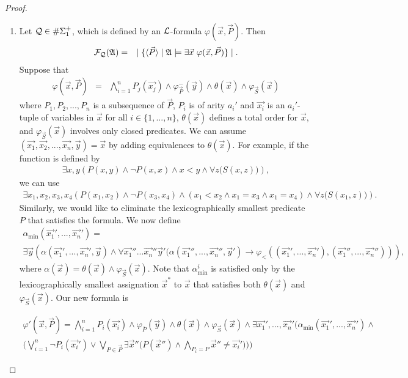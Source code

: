 \documentclass[12pt]{article}
\def\A{{\frak A}}
\def\L{{\cal L}}
\def\Q{{\cal Q}}
\def\F{{\cal F}}
\def\P{\vec{P}}
\def\S{\vec{S}}
\def\x{\vec{x}}
\begin{document}
\begin{proof}
\begin{enumerate}
\item Let $\Q \in \#\Sigma_1^+$, which is defined by an $\L$-formula $\varphi(\x,\P)$. Then
\begin{eqnarray*}
\F_\Q(\A) &=& \mid \{ \langle\P\rangle \mid \A \models \exists \x \ \varphi(\x,\P) \} \mid.
\end{eqnarray*}
Suppose that
\begin{eqnarray*}
\varphi(\x,\P) &=& \bigwedge_{i=1}^n P_j(\vec{x_j}) \wedge \varphi_{\P}^{-}(\vec{y}) \wedge \theta(\x) \wedge \varphi_{\S}(\x)
\end{eqnarray*}
where $P_1,P_2,...,P_n$ is a subsequence of $\P$, $P_i$ is of arity $a_i'$ and $\vec{x_i}$ is an $a_i'$-tuple of variables in $\x$ for all $i \in \{1,...,n\}$, $\theta(\x)$ defines a total order for $\x$, and $\varphi_{\S}(\x)$ involves only closed predicates. We can assume $(\vec{x_1},\vec{x_2},...,\vec{x_n},\vec{y}) = \x$ by adding equivalences to $\theta(\x)$. For example, if the function is defined by
\begin{eqnarray*}
\exists x,y \left( P(x,y) \wedge \neg P(x,x) \wedge x < y \wedge \forall z\big( S(x,z) \big) \right),
\end{eqnarray*}
we can use
\begin{eqnarray*}
\exists x_1,x_2,x_3,x_4 \left( P(x_1,x_2) \wedge \neg P(x_3,x_4) \wedge (x_1 < x_2 \wedge x_1 = x_3 \wedge x_1 = x_4 ) \wedge \forall z\big( S(x_1,z) \big) \right).
\end{eqnarray*}
Similarly, we would like to eliminate the lexicographically smallest predicate $P$ that satisfies the formula. We now define
\begin{multline*}
\alpha_{\min}(\vec{x_1}',...,\vec{x_n}') = \\ \exists\vec{y}\left( \alpha(\vec{x_1}',...,\vec{x_n}',\vec{y})\wedge \forall\vec{x_1}''...\vec{x_n}''\vec{y}'(\alpha(\vec{x_1}'',...,\vec{x_n}'',\vec{y}')\rightarrow \varphi_<((\vec{x_1}',...,\vec{x_n}'),(\vec{x_1}'',...,\vec{x_n}''))\right),
\end{multline*}
where $\alpha(\x) = \theta(\x) \wedge \varphi_{\S}(\x)$. Note that $\alpha_{\min}^i$ is satisfied only by the lexicographically smallest assignation $\x^*$ to $\x$ that satisfies both $\theta(\x)$ and $\varphi_{\S}(\x)$. Our new formula is

\begin{multline*}
\varphi'(\x,\P) = \bigwedge_{i=1}^n P_i(\vec{x_i}) \wedge \varphi_{\overline{P}}(\vec{y}) \wedge \theta(\x) \wedge \varphi_{\S}(\x)\wedge\exists\vec{x_1}',...,\vec{x_n}' \Bigg(\alpha_{\min}(\vec{x_1}',...,\vec{x_n}') \wedge \\ \bigg(\bigvee_{i = 1}^{n}\neg P_i(\vec{x_i}') \vee \bigvee_{P\in\P} \exists \x''\Big( P(\x'') \wedge \bigwedge_{P_i = P} \x'' \neq \vec{x_i}'\Big) \bigg) \Bigg)
\end{multline*}


\end{enumerate}
\end{proof}
\end{document}
